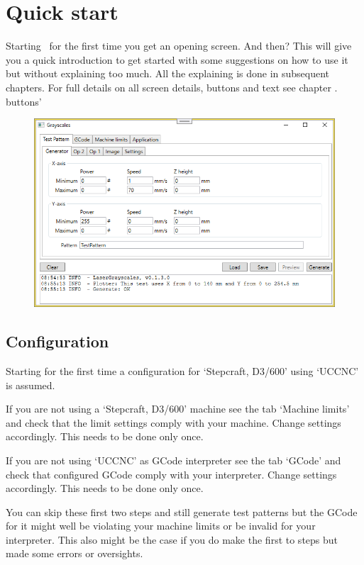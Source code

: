 \chapter{Quick start}\label{QuickStart}

Starting \GS\ for the first time you get an opening screen. And then?
This will give you a quick introduction to get started with some suggestions on how to use it but without explaining too much. All the explaining is done in subsequent chapters.
For full details on all screen details, buttons and text see chapter . buttons'%

\begin{figure}[h!]
    \centering
    \includegraphics[width=0.8\linewidth]{./images/Grayscales-v0.1.3.png}
\end{figure}

\section{Configuration}
Starting for the first time a configuration for `Stepcraft, D3/600' using `UCCNC' is assumed.

If you are not using a `Stepcraft, D3/600' machine see the tab `Machine limits' and check that the limit settings comply with your machine. Change settings accordingly. This needs to be done only once.

If you are not using `UCCNC' as GCode interpreter see the tab `GCode' and check that configured GCode comply with your interpreter. Change settings accordingly. This needs to be done only once.

You can skip these first two steps and still generate test patterns but the GCode for it might well be violating your machine limits or be invalid for your interpreter. This also might be the case
if you do make the first to steps but made some errors or oversights.

